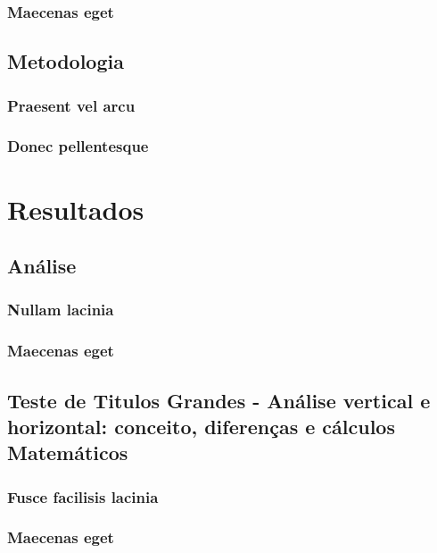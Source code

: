 \documentclass{Arquivos/abntexUFT}
\begin{document}
\section{Maecenas eget}
\lipsum[55]

\chapter{Metodologia}
\section{Praesent vel arcu}
\lipsum[5]

\section{Donec pellentesque}
\lipsum[55]

\part{Resultados}

\chapter{Análise}
\section{Nullam lacinia}
\lipsum[5]

\section{Maecenas eget}
\lipsum[55]

\chapter{Teste de Titulos Grandes - Análise vertical e horizontal: conceito, diferenças e cálculos Matemáticos}
\section{Fusce facilisis lacinia}
\lipsum[5]

\section{Maecenas eget}
\lipsum[55]


\end{document}
